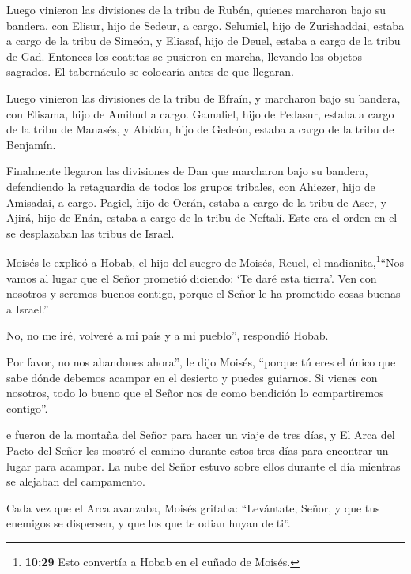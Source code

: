  Luego vinieron las divisiones de la tribu de Rubén,
quienes marcharon bajo su bandera, con Elisur, hijo de Sedeur, a cargo.
 Selumiel, hijo de Zurishaddai, estaba a cargo de la tribu
de Simeón,  y Eliasaf, hijo de Deuel, estaba a cargo de la
tribu de Gad.  Entonces los coatitas se pusieron en marcha,
llevando los objetos sagrados. El tabernáculo se colocaría antes de que
llegaran.

 Luego vinieron las divisiones de la tribu de Efraín, y
marcharon bajo su bandera, con Elisama, hijo de Amihud a cargo.
 Gamaliel, hijo de Pedasur, estaba a cargo de la tribu de
Manasés,  y Abidán, hijo de Gedeón, estaba a cargo de la
tribu de Benjamín.

 Finalmente llegaron las divisiones de Dan que marcharon
bajo su bandera, defendiendo la retaguardia de todos los grupos
tribales, con Ahiezer, hijo de Amisadai, a cargo.  Pagiel,
hijo de Ocrán, estaba a cargo de la tribu de Aser,  y
Ajirá, hijo de Enán, estaba a cargo de la tribu de Neftalí.
 Este era el orden en el se desplazaban las tribus de
Israel.

 Moisés le explicó a Hobab, el hijo del suegro de Moisés,
Reuel, el madianita,\footnote{\textbf{10:29} Esto convertía a Hobab en
  el cuñado de Moisés.}``Nos vamos al lugar que el Señor prometió
diciendo: `Te daré esta tierra'. Ven con nosotros y seremos buenos
contigo, porque el Señor le ha prometido cosas buenas a Israel.''

 No, no me iré, volveré a mi país y a mi pueblo'',
respondió Hobab.

 Por favor, no nos abandones ahora'', le dijo Moisés,
``porque tú eres el único que sabe dónde debemos acampar en el desierto
y puedes guiarnos.  Si vienes con nosotros, todo lo bueno
que el Señor nos de como bendición lo compartiremos contigo''.

 e fueron de la montaña del Señor para hacer un viaje de
tres días, y El Arca del Pacto del Señor les mostró el camino durante
estos tres días para encontrar un lugar para acampar.  La
nube del Señor estuvo sobre ellos durante el día mientras se alejaban
del campamento.

 Cada vez que el Arca avanzaba, Moisés gritaba:
``Levántate, Señor, y que tus enemigos se dispersen, y que los que te
odian huyan de ti''.

